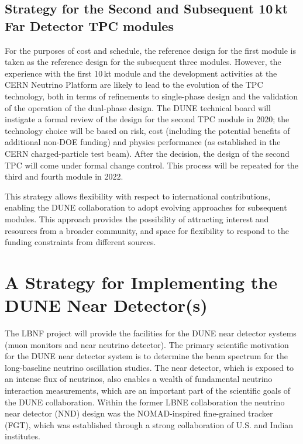 \subsection{Strategy for the Second and Subsequent 10\,kt Far Detector 
TPC modules}

For the purposes of cost and schedule, the reference design for the first module 
is taken as the reference design for the subsequent three modules. However, 
the experience with the first 10\,kt module and the development activities at 
the CERN Neutrino Platform are likely to lead to the evolution of the TPC technology, both 
in terms of refinements to single-phase design and the validation of the operation 
of the dual-phase design. The DUNE technical board will instigate a formal review 
of the design for the second TPC module in 2020; the technology choice 
will be based on risk, cost (including the potential benefits of additional 
non-DOE funding) and physics performance (as established in the CERN charged-particle 
test beam). After the decision, the design of the second TPC will come under formal 
change control. This process will be repeated for the third and fourth module 
in 2022.

This strategy allows flexibility with respect to international contributions, 
enabling the DUNE collaboration to
adopt evolving approaches for subsequent modules. This approach provides the possibility of attracting interest 
and resources from a broader community, and space for flexibility to respond to 
the funding constraints from different sources. 

\section{A Strategy for Implementing the DUNE Near Detector(s)}

The LBNF project will provide the facilities for the DUNE near detector systems 
(muon monitors and near neutrino detector). The primary scientific motivation for 
the DUNE near detector system is to determine the beam spectrum for the long-baseline 
neutrino oscillation studies. The near detector, which is exposed to an intense 
flux of neutrinos, also enables a wealth of fundamental neutrino 
interaction measurements, which are an important part of the  scientific 
goals of the DUNE collaboration. Within the former LBNE collaboration the neutrino 
near detector (NND) design was the NOMAD-inspired fine-grained tracker (FGT), which 
was established through a strong collaboration of U.S. and Indian institutes.

